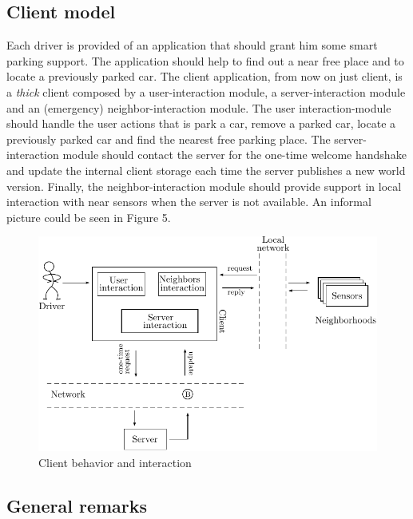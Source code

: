\documentclass[11pt]{article}
\begin{document}
\subsection{Client model}
Each driver is provided of an application that should grant him some smart parking support. The application should help to find out a near free place and to locate a previously parked car. The client application, from now on just client, is a \emph{thick} client composed by a user-interaction module, a server-interaction module and an (emergency) neighbor-interaction module. The user interaction-module should handle the user actions that is park a car, remove a parked car, locate a previously parked car and find the nearest free parking place. The server-interaction module should contact the server for the one-time welcome handshake and update the internal client storage each time the server publishes a new world version. Finally, the neighbor-interaction module should provide support in local interaction with near sensors when the server is not available. An informal picture could be seen in Figure 5.
\begin{figure}
  \centering
	\includegraphics[scale=1]{client}
  \caption{Client behavior and interaction}
\end{figure}

\subsection{General remarks}
\end{document}
